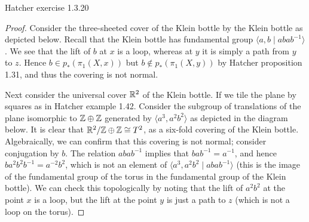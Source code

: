 \documentclass{../../mathnotes}
\begin{document}
\begin{prop}
    Hatcher exercise 1.3.20
\end{prop}
\begin{proof}
    Consider the three-sheeted cover of the Klein bottle by the Klein bottle as depicted below. Recall that
    the Klein bottle has fundamental group $\langle a,b \mid abab^{-1}\rangle$. We see that the lift of $b$
    at $x$ is a loop, whereas at $y$ it is simply a path from $y$ to $z$. Hence $b\in p_*(\pi_1(X,x))$ but
    $b\notin  p_*(\pi_1(X,y))$ by Hatcher proposition 1.31, and thus the covering is not normal.

    Next consider the universal cover $\mathbb{R}^2$ of the Klein bottle. If we tile the plane by squares as in Hatcher
    example 1.42. Consider the subgroup of translations of the plane isomorphic to $\mathbb{Z}\oplus\mathbb{Z}$ generated by
    $\langle a^3, a^2b^2\rangle$ as depicted in the diagram below. It is clear that $\mathbb{R}^2/\mathbb{Z}\oplus\mathbb{Z}\cong T^2$,
    as a six-fold covering of the Klein bottle. Algebraically, we can confirm that this covering is not normal;
    consider conjugation by $b$. The relation $abab^{-1}$ implies that $bab^{-1}=a^{-1}$, and hence
    $ba^2b^2b^{-1}=a^{-2}b^2$, which is not an element of $\langle a^3,a^2b^2 \mid abab^{-1}\rangle$
    (this is the image of the fundamental group of the torus in the fundamental group of the Klein bottle).
    We can check this topologically by noting that the lift of $a^2b^2$ at the point $x$ is a loop, but
    the lift at the point $y$ is just a path to $z$ (which is not a loop on the torus).
\end{proof}
\end{document}
